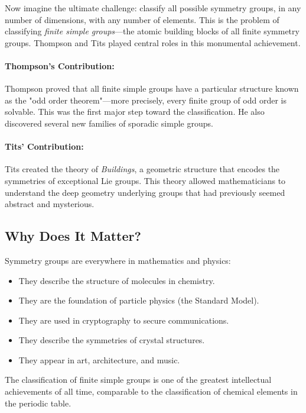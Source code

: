 Now imagine the ultimate challenge: classify all possible symmetry groups, in any number of dimensions, with any number of elements. This is the problem of classifying \emph{finite simple groups}---the atomic building blocks of all finite symmetry groups. Thompson and Tits played central roles in this monumental achievement.

\paragraph{Thompson's Contribution:} Thompson proved that all finite simple groups have a particular structure known as the "odd order theorem"---more precisely, every finite group of odd order is solvable. This was the first major step toward the classification. He also discovered several new families of sporadic simple groups.

\paragraph{Tits' Contribution:} Tits created the theory of \emph{Buildings}, a geometric structure that encodes the symmetries of exceptional Lie groups. This theory allowed mathematicians to understand the deep geometry underlying groups that had previously seemed abstract and mysterious.

\subsection{Why Does It Matter?}

Symmetry groups are everywhere in mathematics and physics:

\begin{itemize}
\item They describe the structure of molecules in chemistry.
\item They are the foundation of particle physics (the Standard Model).
\item They are used in cryptography to secure communications.
\item They describe the symmetries of crystal structures.
\item They appear in art, architecture, and music.
\end{itemize}

The classification of finite simple groups is one of the greatest intellectual achievements of all time, comparable to the classification of chemical elements in the periodic table.

